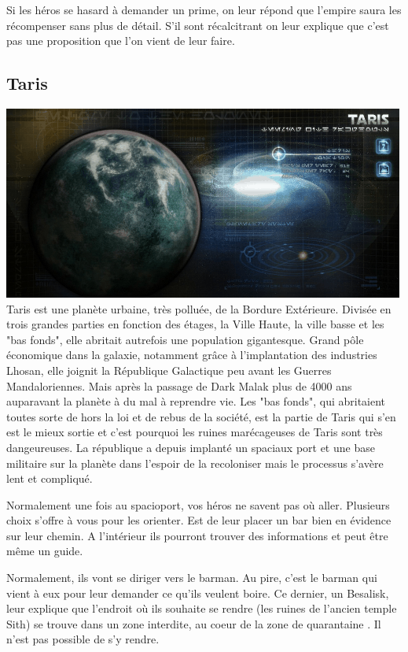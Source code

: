 Si les héros se hasard à demander un prime, on leur répond que l'empire saura les récompenser sans plus de détail. S'il sont récalcitrant on leur explique que c'est pas une proposition que l'on vient de leur faire.


\subsection{Taris} \label{sec:taris}
\noindent\includegraphics[width=\linewidth]{_img/dos-au-muur/taris.png}
Taris est une planète urbaine, très polluée, de la Bordure Extérieure. Divisée en trois grandes parties en fonction des étages, la Ville Haute, la ville basse et les "bas fonds", elle abritait autrefois une population gigantesque. Grand pôle économique dans la galaxie, notamment grâce à l’implantation des industries Lhosan, elle joignit la République Galactique peu avant les Guerres Mandaloriennes. Mais après la passage de Dark Malak plus de 4000 ans auparavant la planète à du mal à reprendre vie. Les "bas fonds", qui abritaient toutes sorte de hors la loi et de rebus de la société, est la partie de Taris qui s'en est le mieux sortie et c'est pourquoi les ruines marécageuses de Taris sont très dangeureuses. La république a depuis implanté un spaciaux port et une base militaire sur la planète dans l'espoir de la recoloniser mais le processus s'avère lent et compliqué.

Normalement une fois au spacioport, vos héros ne savent pas où aller. Plusieurs choix s'offre à vous pour les orienter. Est de leur placer un bar bien en évidence sur leur chemin. A l'intérieur ils pourront trouver des informations et peut être même un guide.

Normalement, ils vont se diriger vers le barman. Au pire, c'est le barman qui vient à eux pour leur demander ce qu'ils veulent boire. Ce dernier, un Besalisk, leur explique que l'endroit où ils souhaite se rendre (les ruines de l'ancien temple Sith) se trouve dans un zone interdite, au coeur de la zone de quarantaine . Il n'est pas possible de s'y rendre.


